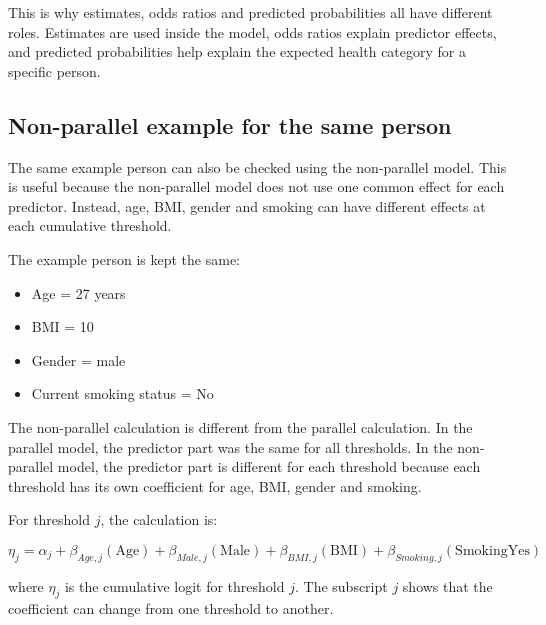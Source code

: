 \documentclass{article}
\providecommand{\tightlist}{%
  \setlength{\itemsep}{0pt}\setlength{\parskip}{0pt}}
\begin{document}
This is why estimates, odds ratios and predicted probabilities all have
different roles. Estimates are used inside the model, odds ratios
explain predictor effects, and predicted probabilities help explain the
expected health category for a specific person.

\subsection{Non-parallel example for the same
person}\label{non-parallel-example-for-the-same-person}

The same example person can also be checked using the non-parallel
model. This is useful because the non-parallel model does not use one
common effect for each predictor. Instead, age, BMI, gender and smoking
can have different effects at each cumulative threshold.

The example person is kept the same:

\begin{itemize}
\tightlist
\item
  Age = 27 years
\item
  BMI = 10
\item
  Gender = male
\item
  Current smoking status = No
\end{itemize}

The non-parallel calculation is different from the parallel calculation.
In the parallel model, the predictor part was the same for all
thresholds. In the non-parallel model, the predictor part is different
for each threshold because each threshold has its own coefficient for
age, BMI, gender and smoking.

For threshold \(j\), the calculation is:

\[
\eta_j = \alpha_j + \beta_{Age,j}(\mathrm{Age}) + \beta_{Male,j}(\mathrm{Male}) + \beta_{BMI,j}(\mathrm{BMI}) + \beta_{Smoking,j}(\mathrm{SmokingYes})
\]

where \(\eta_j\) is the cumulative logit for threshold \(j\). The
subscript \(j\) shows that the coefficient can change from one threshold
to another.
\end{document}
